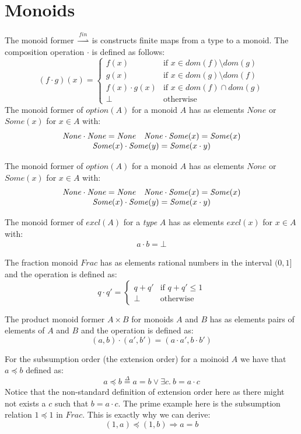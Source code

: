 \documentclass[]{scrartcl}
\newcommand{\defeq}{\overset{\Delta}{=}}
\newcommand{\dom}{\mathit{dom}}
\newcommand{\None}{\mathit{None}}
\newcommand{\Some}{\mathit{Some}}
\newcommand{\option}{\mathit{option}}
\newcommand{\excl}{\mathit{excl}}
\newcommand{\Frac}{\mathit{Frac}}
\newcommand{\finmap}{\overset{\mathit{fin}}{\rightharpoonup}}
\begin{document}



\appendix
\section{Monoids}
The monoid former $\finmap$ is constructs finite maps from a type to a monoid.
The composition operation $\cdot$ is defined as follows:
\[
(f \cdot g) (x) = \left\{
\begin{array}{ll}
f(x) & \text{if } x \in \dom(f)\setminus\dom(g)\\
g(x) & \text{if } x \in \dom(g)\setminus\dom(f)\\
f(x) \cdot g(x) & \text{if } x \in \dom(f)\cap\dom(g)\\
\bot & \text{otherwise}
\end{array}
\right.
\]
The monoid former of $\option(A)$ for a monoid $A$ has as elements 
$\None$ or $\Some(x)$ for $x \in A$ with:
\[
\begin{array}{ll}
\None \cdot \None = \None & \None \cdot \Some(x) = \Some(x) \\
\multicolumn{2}{c}{\Some(x) \cdot \Some(y) = \Some(x \cdot y)}
\end{array}
\]

The monoid former of $\option(A)$ for a monoid $A$ has as elements 
$\None$ or $\Some(x)$ for $x \in A$ with:
\[
\begin{array}{ll}
\None \cdot \None = \None & \None \cdot \Some(x) = \Some(x) \\
\multicolumn{2}{c}{\Some(x) \cdot \Some(y) = \Some(x \cdot y)}
\end{array}
\]

The monoid former of $\excl(A)$ for a \emph{type} $A$ has as elements 
$\excl(x)$ for $x \in A$ with:
\[
\begin{array}{ll}
a \cdot b = \bot
\end{array}
\]

The fraction monoid $\Frac$ has as elements rational numbers in the interval $(0, 1]$ and the operation is defined as:
\[
q \cdot q' = \left\{
\begin{array}{ll}
q + q' & \text{if } q + q' \le 1\\
\bot & \text{otherwise}
\end{array}
\right.
\]

The product monoid former $A \times B$ for monoids $A$ and $B$ has as elements pairs of elements of $A$ and $B$ and the operation is defined as:
\[
(a, b) \cdot (a', b') = (a \cdot a', b \cdot b')
\]

For the subsumption order (the extension order) for a moinoid $A$ we have that $a \preceq b$ defined as:
\[
a \preceq b \defeq a = b \lor \exists c.~b = a \cdot c
\]
Notice that the non-standard definition of extension order here as
there might not exists a $c$ such that $b = a \cdot c$.
The prime example here is the subsumption relation $1 \preceq 1$ in
$\Frac$.
This is exactly why we can derive:
\[
(1, a) \preceq (1, b) \Rightarrow a = b
\]
\end{document}
